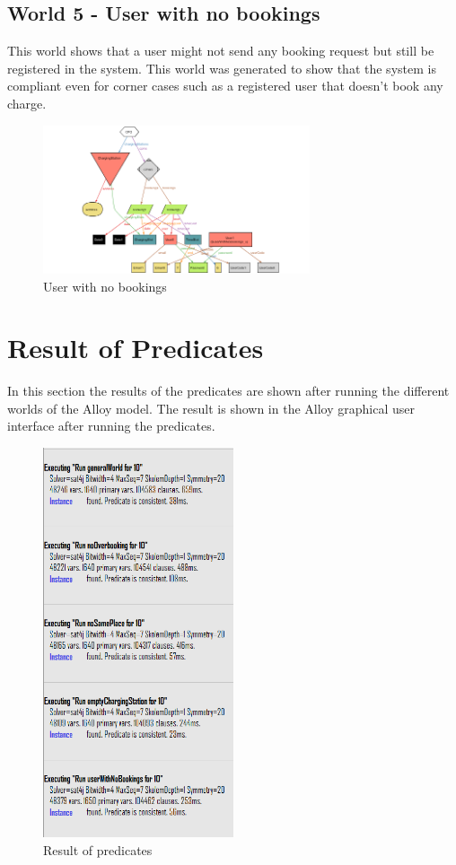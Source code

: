 \documentclass[12pt]{report}
\begin{document}
\subsection{World 5 - User with no bookings}
This world shows that a user might not send any booking request but still be registered in the system. This world was generated to show that the system is compliant even for corner cases such as a registered user that doesn't book any charge.
\begin{figure}[h]
    \centering
    \includegraphics[width = 0.7\textwidth]{assets/alloy_5.png}
    \caption{User with no bookings}
\end{figure}

\newpage
\section{Result of Predicates}
In this section the results of the predicates are shown after running the different worlds of the Alloy model. The result is shown in the Alloy graphical user interface after running the
predicates.
\begin{figure}[h]
    \centering
    \includegraphics[width = 0.5\textwidth]{assets/alloy_6.png}
    \caption{Result of predicates}
\end{figure}
\end{document}

